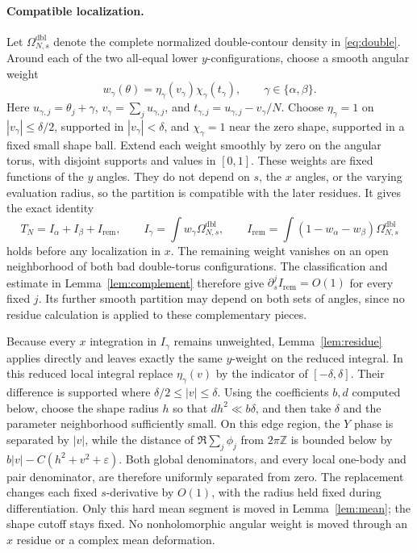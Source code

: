 \documentclass[11pt]{article}
\numberwithin{equation}{section}
\theoremstyle{definition}
\newcommand{\Z}{\mathbb Z}
\newcommand{\eps}{\varepsilon}
\begin{document}
\paragraph{Compatible localization.}
Let \(\Omega^{\mathrm{dbl}}_{N,s}\) denote the complete normalized
double-contour density in \eqref{eq:double}. Around each of the two
all-equal lower \(y\)-configurations, choose a smooth angular weight
\[
 w_\gamma(\theta)=\eta_\gamma(v_\gamma)\chi_\gamma(t_\gamma),
 \qquad \gamma\in\{\alpha,\beta\}.
\]
Here \(u_{\gamma,j}=\theta_j+\gamma\),
\(v_\gamma=\sum_j u_{\gamma,j}\), and
\(t_{\gamma,j}=u_{\gamma,j}-v_\gamma/N\).
Choose \(\eta_\gamma=1\) on \(|v_\gamma|\le\delta/2\), supported
in \(|v_\gamma|<\delta\), and \(\chi_\gamma=1\) near the zero shape,
supported in a fixed small shape ball. Extend each weight smoothly by
zero on the angular torus, with disjoint supports and values in \([0,1]\).
These weights are fixed functions of the \(y\) angles. They do not
depend on \(s\), the \(x\) angles, or the varying evaluation radius,
so the partition is compatible with the later residues. It gives the exact identity
\[
 T_N=I_\alpha+I_\beta+I_{\mathrm{rem}},\qquad
 I_\gamma=\int w_\gamma\Omega^{\mathrm{dbl}}_{N,s},\qquad
 I_{\mathrm{rem}}=\int(1-w_\alpha-w_\beta)
                         \Omega^{\mathrm{dbl}}_{N,s}
\]
holds before any localization in \(x\).
The remaining weight vanishes on an open neighborhood of both bad
double-torus configurations. The classification and estimate in
Lemma~\ref{lem:complement} therefore give
\(\partial_s^j I_{\mathrm{rem}}=O(1)\) for every fixed \(j\).
Its further smooth partition may depend on both sets of angles,
since no residue calculation is applied to these complementary pieces.

Because every \(x\) integration in \(I_\gamma\) remains unweighted,
Lemma~\ref{lem:residue} applies directly and leaves exactly the same
\(y\)-weight on the reduced integral. In this reduced local integral replace
\(\eta_\gamma(v)\) by the indicator of \([-\delta,\delta]\).
Their difference is supported where \(\delta/2\le |v|\le\delta\).
Using the coefficients \(b,d\) computed below, choose the shape radius
\(h\) so that \(dh^2\ll b\delta\), and then take \(\delta\) and
the parameter neighborhood sufficiently small. On this edge region,
the \(Y\) phase is separated by \(|v|\), while the distance of
\(\Re\sum_j\phi_j\) from \(2\pi\Z\) is bounded below by
\(b|v|-C(h^2+v^2+\eps)\). Both global denominators, and every local
one-body and pair denominator, are therefore uniformly separated
from zero. The replacement changes each fixed \(s\)-derivative by
\(O(1)\), with the radius held fixed during differentiation.
Only this hard mean segment is moved in Lemma~\ref{lem:mean}; the
shape cutoff stays fixed. No nonholomorphic angular weight is moved
through an \(x\) residue or a complex mean deformation.
\end{document}

